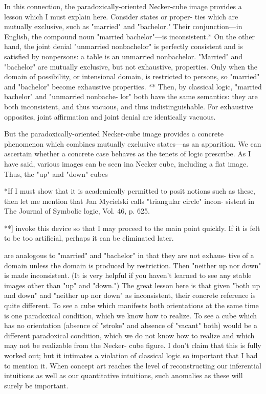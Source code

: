 In this connection, the paradoxically-oriented Necker-cube image 
provides a lesson which I must explain here. Consider states or proper- 
ties which are mutually exclusive, such as "married" and "bachelor." 
Their conjunction---in English, the compound noun "married 
bachelor"---is inconsistent.* On the other hand, the joint denial 
"unmarried nonbachelor" is perfectly consistent and is satisfied by 
nonpersons: a table is an unmarried nonbachelor. "Married" and 
"bachelor" are mutually exclusive, but not exhaustive, properties. Only 
when the domain of possibility, or intensional domain, is restricted to 
persons, so "married" and "bachelor" become exhaustive properties. ** 
Then, by classical logic, "married bachelor" and "unmarried nonbache- 
lor" both have the same semantics: they are both inconsistent, and thus 
vacuous, and thus indistinguishable. For exhaustive opposites, joint 
affirmation and joint denial are identically vacuous. 

But the paradoxically-oriented Necker-cube image provides a 
concrete phenomenon which combines mutually exclusive states---as 
an apparition. We can ascertain whether a concrete case behaves as the 
tenets of logic prescribe. As I have said, various images can be seen ina 
Necker cube, including a flat image. Thus, the "up" and "down" cubes 


*If I must show that it is academically permitted to posit notions such as 
these, then let me mention that Jan Mycielski calls "triangular circle" incon- 
sistent in The Journal of Symbolic logic, Vol. 46, p. 625. 

**] invoke this device so that I may proceed to the main point quickly. If it 
is felt to be too artificial, perhaps it can be eliminated later. 


are analogous to "married" and "bachelor" in that they are not exhaus- 
tive of a domain unless the domain is produced by restriction. Then 
"neither up nor down" is made inconsistent. (It is very helpful if you 
haven't learned to see any stable images other than "up" and "down.") 
The great lesson here is that given "both up and down" and "neither up 
nor down" as inconsistent, their concrete reference is quite different. To 
see a cube which manifests both orientations at the same time is one 
paradoxical condition, which we know how to realize. To see a cube 
which has no orientation (absence of "stroke" and absence of "vacant" 
both) would be a different paradoxical condition, which we do not 
know how to realize and which may not be realizable from the Necker- 
cube figure. I don't claim that this is fully worked out; but it intimates a 
violation of classical logic so important that I had to mention it. When 
concept art reaches the level of reconstructing our inferential intuitions 
as well as our quantitative intuitions, such anomalies as these will surely 
be important. 

